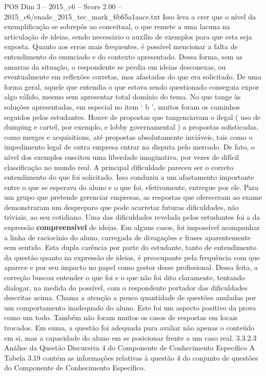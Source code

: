 \begin{textsample}{POS Dim 3 – 2015\_c6 – Score 2.00 – 2015\_c6/enade\_2015\_tec\_mark\_6b65a1aace.txt}
Isso leva a crer que o nível da exemplificação se sobrepôs ao conceitual, o que remete a uma lacuna na articulação de ideias, sendo necessário o auxílio de exemplos para que esta seja exposta.
Quanto aos erros mais frequentes, é possível mencionar a falta de entendimento do enunciado e do contexto apresentado.
Dessa forma, sem as amarras da situação, o respondente se perdia em ideias desconexas, ou eventualmente em reflexões corretas, mas afastadas do que era solicitado.
De uma forma geral, aquele que entendia o que estava sendo questionado conseguia expor algo válido, mesmo sem apresentar total domínio do tema.
No que tange às soluções apresentadas, em especial no item ‘ b ’, muitos foram os caminhos seguidos pelos estudantes.
Houve de propostas que tangenciavam o ilegal ( uso de dumping e cartel, por exemplo, e lobby governamental ) a propostas sofisticadas, como merges e acquisitions, até propostas absolutamente inviáveis, tais como o impedimento legal de outra empresa entrar na disputa pelo mercado.
De fato, o nível dos exemplos suscitou uma liberdade imaginativa, por vezes de difícil classificação no mundo real.
A principal dificuldade pareceu ser o correto entendimento do que foi solicitado.
Isso conduziu a um afastamento importante entre o que se esperava do aluno e o que foi, efetivamente, entregue por ele.
Para um grupo que pretende gerenciar empresas, as respostas que ofereceram ao exame demonstraram um despreparo que pode acarretar futuras dificuldades, não triviais, ao seu cotidiano.
Uma das dificuldades revelada pelos estudantes foi a da expressão \textbf{compreensível} de ideias.
Em alguns casos, foi impossível acompanhar a linha de raciocínio do aluno, carregada de divagações e frases aparentemente sem sentido.
Esta dupla carência por parte do estudante, tanto de entendimento da questão quanto na expressão de ideias, é preocupante pela frequência com que aparece e por seu impacto no papel como gestor desse profissional.
Dessa feita, a correção buscou entender o que foi e o que não foi dito claramente, tentando dialogar, na medida do possível, com o respondente portador das dificuldades descritas acima.
Chama a atenção a pouco quantidade de questões anuladas por um comportamento inadequado do aluno.
Este foi um aspecto positivo da prova como um todo.
Também não foram muitos os casos de respostas em locais trocados.
Em suma, a questão foi adequada para avaliar não apenas o conteúdo em si, mas a capacidade do aluno em se posicionar frente a um caso real. 3.3.2.3 Análise da Questão Discursiva 4 do Componente de Conhecimento Específico A Tabela 3.19 contém as informações relativas à questão 4 do conjunto de questões do Componente de Conhecimento Específico.

\end{textsample}
